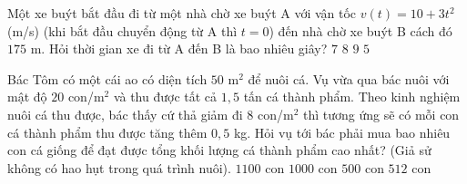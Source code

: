 \begin{ex}%
	Một xe buýt bắt đầu đi từ một nhà chờ xe buýt A với vận tốc $v(t)=10+3t^2$ (m/s) (khi bắt đầu chuyển động từ A thì $t=0$) đến nhà chờ xe buýt B cách đó $175$ m. Hỏi thời gian xe đi từ A đến B là bao nhiêu giây? 
	\choice
	{$7$	}
	{$8$	}
	{$9$	}
	{\True $5$ }
\end{ex}
\begin{ex}%
	Bác Tôm có một cái ao có diện tích $50$ m$^2$ để nuôi cá. Vụ vừa qua bác nuôi với mật độ $20$ con/m$^2$ và thu được tất cả $1{,}5$ tấn cá thành phẩm. Theo kinh nghiệm nuôi cá thu được, bác thấy cứ thả giảm đi $8 $ con/m$^2$ thì tương ứng sẽ có mỗi con cá thành phẩm thu được tăng thêm $0{,}5$ kg. Hỏi vụ tới bác phải mua bao nhiêu con cá giống để đạt được tổng khối lượng cá thành phẩm cao nhất? (Giả sử không có hao hụt trong quá trình nuôi). 
	\choice
	{$1100$ con}
	{$1000$ con}
	{$500$ con}
	{\True $512$ con}
\end{ex}
